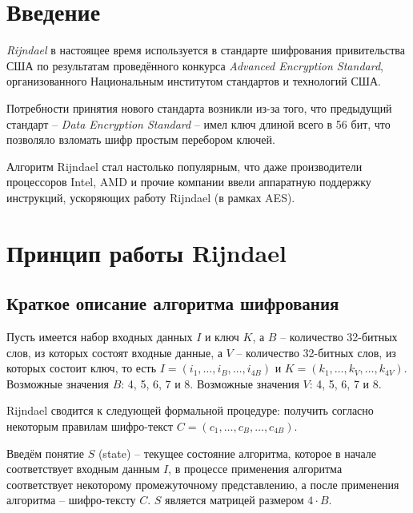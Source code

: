 \section{Введение}

    \textit{Rijndael} в настоящее время используется в стандарте шифрования привительства США по
    результатам проведённого конкурса \textit{Advanced Encryption Standard}, организованного
    Национальным институтом стандартов и технологий США.

    Потребности принятия нового стандарта возникли из-за того, что предыдущий стандарт --
    \textit{Data Encryption Standard} -- имел ключ длиной всего в 56 бит, что позволяло взломать
    шифр простым перебором ключей.

    Алгоритм Rijndael стал настолько популярным, что даже производители процессоров Intel, AMD и прочие
    компании ввели аппаратную поддержку инструкций, ускоряющих работу Rijndael (в рамках AES).

\section{Принцип работы Rijndael}
\subsection{Краткое описание алгоритма шифрования}

    Пусть имеется набор входных данных $I$ и ключ $K$, а $B$ -- количество 32-битных слов, из которых
    состоят входные данные, а $V$ -- количество 32-битных слов, из которых
    состоит ключ, то есть $I = (i_1, \dots, i_{B}, \dots, i_{4B})$ и
    $K = (k_1, \dots, k_{V}, \dots, k_{4V})$.
    Возможные значения $B$: 4, 5, 6, 7 и 8. Возможные значения $V$: 4, 5, 6, 7 и 8.

    Rijndael сводится к следующей формальной процедуре: получить согласно некоторым правилам
    шифро-текст $C = (c_1, \dots, c_{B}, \dots, c_{4B})$.

    Введём понятие $S$ (state) -- текущее состояние алгоритма, которое в начале соответствует входным данным $I$,
    в процессе применения алгоритма соответствует некоторому промежуточному представлению,
    а после применения алгоритма -- шифро-тексту $C$. $S$ является матрицей размером $4 \cdot B$.


